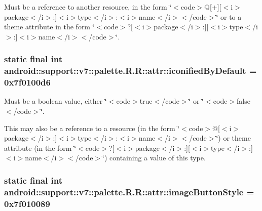 Must be a reference to another resource, in the form \char`\"{}$<$code$>$@\mbox{[}+\mbox{]}\mbox{[}$<$i$>$package$<$/i$>$:\mbox{]}$<$i$>$type$<$/i$>$:$<$i$>$name$<$/i$>$$<$/code$>$\char`\"{} or to a theme attribute in the form \char`\"{}$<$code$>$?\mbox{[}$<$i$>$package$<$/i$>$:\mbox{]}\mbox{[}$<$i$>$type$<$/i$>$:\mbox{]}$<$i$>$name$<$/i$>$$<$/code$>$\char`\"{}. \hypertarget{classandroid_1_1support_1_1v7_1_1palette_1_1_r_1_1attr_e9f623f52e3cacac6aa4484a25db3795}{
\subsubsection[{iconifiedByDefault}]{\setlength{\rightskip}{0pt plus 5cm}static final int android::support::v7::palette.R.R::attr::iconifiedByDefault = 0x7f0100d6}}
\label{classandroid_1_1support_1_1v7_1_1palette_1_1_r_1_1attr_e9f623f52e3cacac6aa4484a25db3795}


Must be a boolean value, either \char`\"{}$<$code$>$true$<$/code$>$\char`\"{} or \char`\"{}$<$code$>$false$<$/code$>$\char`\"{}. 

This may also be a reference to a resource (in the form \char`\"{}$<$code$>$@\mbox{[}$<$i$>$package$<$/i$>$:\mbox{]}$<$i$>$type$<$/i$>$:$<$i$>$name$<$/i$>$$<$/code$>$\char`\"{}) or theme attribute (in the form \char`\"{}$<$code$>$?\mbox{[}$<$i$>$package$<$/i$>$:\mbox{]}\mbox{[}$<$i$>$type$<$/i$>$:\mbox{]}$<$i$>$name$<$/i$>$$<$/code$>$\char`\"{}) containing a value of this type. \hypertarget{classandroid_1_1support_1_1v7_1_1palette_1_1_r_1_1attr_746fc4203b6c68cd1964055d7ea53411}{
\subsubsection[{imageButtonStyle}]{\setlength{\rightskip}{0pt plus 5cm}static final int android::support::v7::palette.R.R::attr::imageButtonStyle = 0x7f010089}}
\label{classandroid_1_1support_1_1v7_1_1palette_1_1_r_1_1attr_746fc4203b6c68cd1964055d7ea53411}


